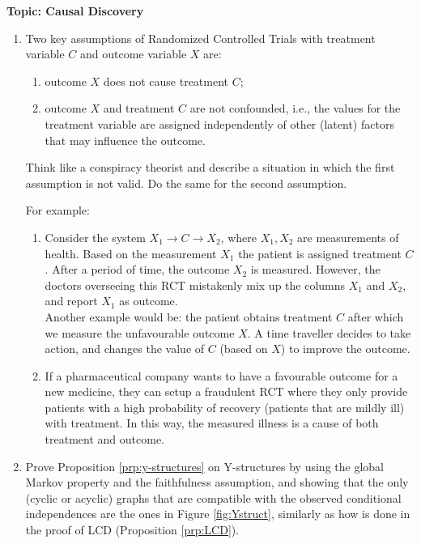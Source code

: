 
\flushleft\textbf{Topic: Causal Discovery}

\begin{enumerate}
	\item %
	Two key assumptions of Randomized Controlled Trials with treatment variable $C$ and outcome variable $X$ are:
	\begin{enumerate}
		\item outcome $X$ does not cause treatment $C$;
		\item outcome $X$ and treatment $C$ are not confounded, i.e., the values for
		the treatment variable are assigned independently of other (latent) factors that may influence
		the outcome.
	\end{enumerate}

	Think like a conspiracy theorist and describe a situation in which the first assumption is not valid. Do the same for the second assumption.

	\begin{ungradedsolution}
		For example:
		\begin{enumerate}
			\item Consider the system $X_1 \to C \to X_2$, where $X_1, X_2$ are measurements of health. Based on the measurement $X_1$ the patient is assigned treatment $C$. After a period of time, the outcome $X_2$ is measured. However, the doctors overseeing this RCT mistakenly mix up the columns $X_1$ and $X_2$, and report $X_1$ as outcome.\\
			Another example would be: the patient obtains treatment $C$ after which we measure the unfavourable outcome $X$. A time traveller decides to take action, and changes the value of $C$ (based on $X$) to improve the outcome.
			\item If a pharmaceutical company wants to have a favourable outcome for a new medicine, they can setup a fraudulent RCT where they only provide patients with a high probability of recovery (patients that are mildly ill) with treatment. In this way, the measured illness is a cause of both treatment and outcome.
		\end{enumerate}
	\end{ungradedsolution}

	\item %
	Prove Proposition \ref*{prp:y-structures} on Y-structures by using the global Markov property and the faithfulness assumption, and showing that the only (cyclic or acyclic) graphs that are compatible with the observed
	conditional independences are the ones in Figure \ref*{fig:Ystruct}, similarly as how is done in the proof of LCD (Proposition \ref*{prp:LCD}).


\end{enumerate}
